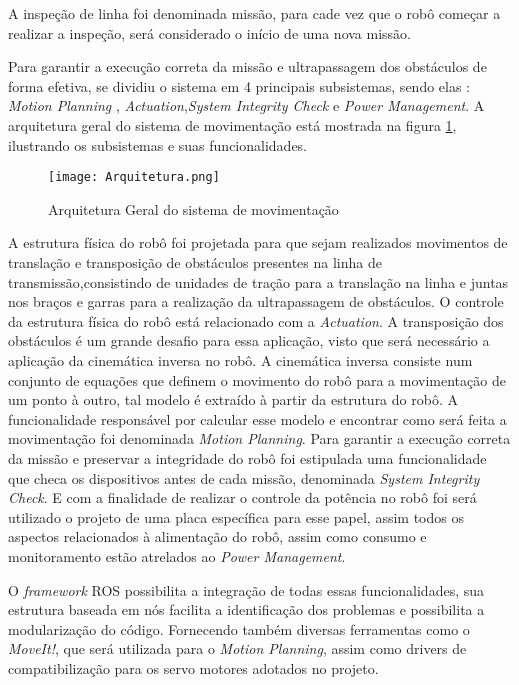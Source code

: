 A inspeção de linha foi denominada missão, para cade vez que o robô começar a realizar a inspeção, será considerado o início de uma nova missão. 

Para garantir a execução correta da missão e ultrapassagem dos obstáculos de forma efetiva, se dividiu o sistema em 4 principais subsistemas, sendo elas : \textit{Motion Planning} , \textit{Actuation},\textit{System Integrity Check} e \textit{Power Management}. A arquitetura geral do sistema de movimentação está mostrada na figura \ref{fig:arq_geral}, ilustrando os subsistemas e suas funcionalidades. 
\begin{figure}[h]
	\centering
	\texttt{[image: Arquitetura.png]}
	\caption{Arquitetura Geral do sistema de movimentação}
	\label{fig:arq_geral}
\end{figure} 
A estrutura física do robô foi projetada para que sejam realizados movimentos de translação e transposição de obstáculos presentes na linha de transmissão,consistindo de unidades de tração para a translação na linha e juntas nos braços e garras para a realização da ultrapassagem de obstáculos. O controle da estrutura física do robô está relacionado com a \textit{Actuation}.
A transposição dos obstáculos é um grande desafio para essa aplicação, visto que será necessário a aplicação da cinemática inversa no robô. A cinemática inversa consiste num conjunto de equações que definem o movimento do robô para a movimentação de um ponto à outro, tal modelo é extraído à partir da estrutura do robô. A funcionalidade responsável por calcular esse modelo e encontrar como será feita a movimentação foi denominada \textit{Motion Planning}.
Para garantir a execução correta da missão e preservar a integridade do robô foi estipulada uma funcionalidade que checa os dispositivos antes de cada missão, denominada \textit{System Integrity Check}. E com a finalidade de realizar o controle da potência no robô foi será utilizado o projeto de uma placa específica para esse papel, assim todos os aspectos relacionados à alimentação do robô, assim como consumo e monitoramento estão atrelados ao \textit{Power Management}.

O \textit{framework} ROS possibilita a integração de todas essas funcionalidades, sua estrutura baseada em nós facilita a identificação dos problemas e possibilita a modularização do código. Fornecendo também diversas ferramentas como o \textit{MoveIt!}, que será utilizada para o \textit{Motion Planning}, assim como drivers de compatibilização para os servo motores adotados no projeto.

